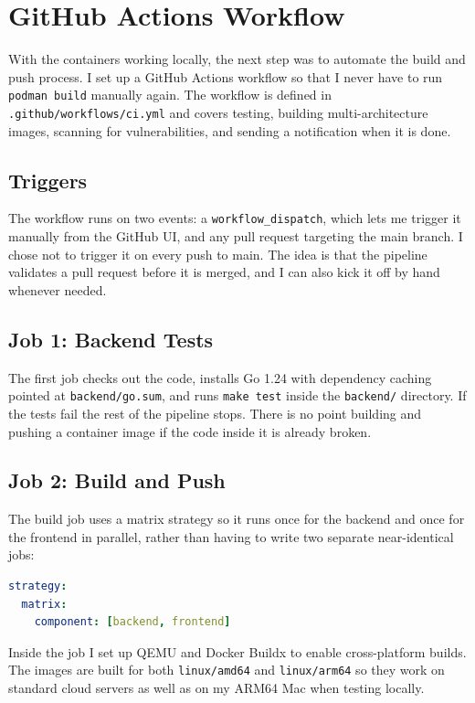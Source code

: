 \section{GitHub Actions Workflow}

With the containers working locally, the next step was to automate the build and push
process. I set up a GitHub Actions workflow so that I never have to run
\texttt{podman build} manually again. The workflow is defined in
\texttt{.github/workflows/ci.yml} and covers testing, building multi-architecture
images, scanning for vulnerabilities, and sending a notification when it is done.

\subsection{Triggers}

The workflow runs on two events: a \texttt{workflow\_dispatch}, which lets me trigger it
manually from the GitHub UI, and any pull request targeting the main branch. I chose not
to trigger it on every push to main. The idea is that the pipeline validates a pull
request before it is merged, and I can also kick it off by hand whenever needed.

\subsection{Job 1: Backend Tests}

The first job checks out the code, installs Go 1.24 with dependency caching pointed at
\texttt{backend/go.sum}, and runs \texttt{make test} inside the \texttt{backend/}
directory. If the tests fail the rest of the pipeline stops. There is no point building
and pushing a container image if the code inside it is already broken.

\subsection{Job 2: Build and Push}

The build job uses a matrix strategy so it runs once for the backend and once for the
frontend in parallel, rather than having to write two separate near-identical jobs:

\begin{lstlisting}[language=yaml]
strategy:
  matrix:
    component: [backend, frontend]
\end{lstlisting}

Inside the job I set up QEMU and Docker Buildx to enable cross-platform builds. The
images are built for both \texttt{linux/amd64} and \texttt{linux/arm64} so they work on
standard cloud servers as well as on my ARM64 Mac when testing locally.

